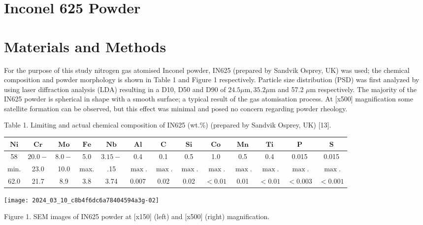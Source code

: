 \documentclass[10pt]{article}
\begin{document}
\section*{Inconel 625 Powder}
\section*{Materials and Methods}
For the purpose of this study nitrogen gas atomised Inconel powder, IN625 (prepared by Sandvik Osprey, UK) was used; the chemical composition and powder morphology is shown in Table 1 and Figure 1 respectively. Particle size distribution (PSD) was first analyzed by using laser diffraction analysis (LDA) resulting in a D10, D50 and D90 of $24.5 \mu \mathrm{m}, 35.2 \mu \mathrm{m}$ and 57.2 $\mu \mathrm{m}$ respectively. The majority of the IN625 powder is spherical in shape with a smooth surface; a typical result of the gas atomisation process. At [x500] magnification some satellite formation can be observed, but this effect was minimal and posed no concern regarding powder rheology.

Table 1. Limiting and actual chemical composition of IN625 (wt.\%) (prepared by Sandvik Osprey, UK) [13].

\begin{center}
\begin{tabular}{ccccccccccccc}
\hline
$\mathbf{N i}$ & $\mathbf{C r}$ & $\mathbf{M o}$ & $\mathbf{F e}$ & $\mathbf{N b}$ & $\mathbf{A l}$ & $\mathbf{C}$ & $\mathbf{S i}$ & $\mathbf{C o}$ & $\mathbf{M n}$ & $\mathbf{T i}$ & $\mathbf{P}$ & $\mathbf{S}$ \\
\hline
58 & $20.0-$ & $8.0-$ & 5.0 & $3.15-$ & 0.4 & 0.1 & 0.5 & 1.0 & 0.5 & 0.4 & 0.015 & 0.015 \\
min. & 23.0 & 10.0 & max. & .15 & $\max$. & $\max$. & $\max$. & $\max$. & $\max$. & $\max$. & $\max$. & $\max$. \\
\hline
62.0 & 21.7 & 8.9 & 3.8 & 3.74 & 0.007 & 0.02 & 0.02 & $<0.01$ & 0.01 & $<0.01$ & $<0.003$ & $<0.001$ \\
\hline
\end{tabular}
\end{center}

\begin{center}
\texttt{[image: 2024\_03\_10\_c8b4f6dc6a78404594a3g-02]}
\end{center}

Figure 1. SEM images of IN625 powder at [x150] (left) and [x500] (right) magnification.
\end{document}
